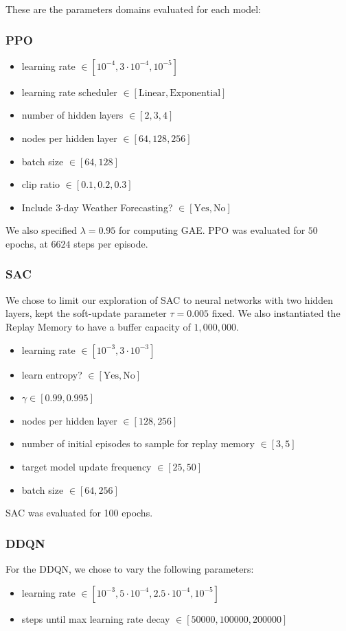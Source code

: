\documentclass[12pt]{article}
\begin{document}
These are the parameters domains evaluated for each model:
\subsubsection{PPO}
\begin{itemize}
    \item learning rate $\in [10^{-4}, 3\cdot10^{-4}, 10^{-5}]$
    \item learning rate scheduler $\in [\text{Linear}, \text{Exponential}]$
    \item number of hidden layers $\in [2, 3, 4]$
    \item nodes per hidden layer $\in [64, 128, 256]$
    \item batch size $\in [64, 128]$
    \item clip ratio $\in [0.1, 0.2, 0.3]$
    \item Include 3-day Weather Forecasting? $\in [\text{Yes}, \text{No}]$
\end{itemize}

We also specified $\lambda = 0.95$ for computing GAE. PPO was evaluated for $50$ epochs, at $6624$ steps per episode. 

\subsubsection{SAC}
We chose to limit our exploration of SAC to neural networks with two hidden layers, kept the soft-update parameter $\tau = 0.005$ fixed. We also instantiated the Replay Memory to have a buffer capacity of $1,000,000$. 
\begin{itemize}
    \item learning rate $\in [10^{-3}, 3 \cdot 10^{-3}]$
    \item learn entropy? $\in [\text{Yes}, \text{No}]$
    \item $\gamma \in [0.99, 0.995]$
    \item nodes per hidden layer $\in [128, 256]$
    \item number of initial episodes to sample for replay memory $\in [3, 5]$
    \item target model update frequency $\in [25, 50]$
    \item batch size $\in [64, 256]$
\end{itemize}

SAC was evaluated for 100 epochs. 

\subsubsection{DDQN}
For the DDQN, we chose to vary the following parameters:
\begin{itemize}
    \item learning rate $\in [10^{-3}, 5 \cdot 10^{-4}, 2.5 \cdot 10^{-4}, 10^{-5}]$
    \item steps until max learning rate decay $\in [50000, 100000, 200000]$
\end{itemize}
\end{document}
